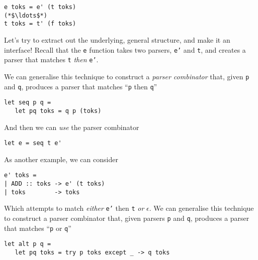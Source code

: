 \begin{verbatim}
e toks = e' (t toks)
(*$\ldots$*)
t toks = t' (f toks)
\end{verbatim}

Let's try to extract out the underlying, general structure, and make it an interface! Recall that the \texttt{e} function takes two parsers, \texttt{e'} and \texttt{t}, and creates a parser that matches \texttt{t} \textit{then} \texttt{e'}.

We can generalise this technique to construct a \textit{parser combinator} that, given \texttt{p} and \texttt{q}, produces a parser that matches ``\texttt{p} then \texttt{q}''

\begin{verbatim}
let seq p q = 
   let pq toks = q p (toks)
\end{verbatim}
And then we can \textit{use} the parser combinator 
\begin{verbatim}
let e = seq t e'
\end{verbatim}
As another example, we can consider
\begin{verbatim}
e' toks =
| ADD :: toks -> e' (t toks)
| toks        -> toks
\end{verbatim}
Which attempts to match \textit{either} \texttt{e'} then \texttt{t} \textit{or} $\epsilon$. We can generalise this technique to construct a parser combinator that, given parsers \texttt{p} and \texttt{q}, produces a parser that matches ``\texttt{p} or \texttt{q}''

\begin{verbatim}
let alt p q = 
   let pq toks = try p toks except _ -> q toks
\end{verbatim}

